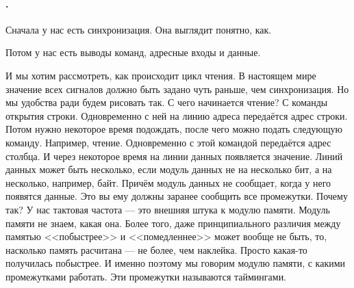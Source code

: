 \documentclass{article}
\begin{document}
    \paragraph{.}
    Сначала у нас есть синхронизация. Она выглядит понятно, как.
    \begin{center}
    \end{center}
    Потом у нас есть выводы команд, адресные входы и данные.
    \begin{center}
    \end{center}
    И мы хотим рассмотреть, как происходит цикл чтения. В настоящем мире значение всех сигналов должно быть задано чуть раньше, чем синхронизация. Но мы удобства ради будем рисовать так. С чего начинается чтение? С команды открытия строки. Одновременно с ней на линию адреса передаётся адрес строки. Потом нужно некоторое время подождать, после чего можно подать следующую команду. Например, чтение. Одновременно с этой командой передаётся адрес столбца. И через некоторое время на линии данных появляется значение. Линий данных может быть несколько, если модуль данных не на несколько бит, а на несколько, например, байт. Причём модуль данных не сообщает, когда у него появятся данные. Это вы ему должны заранее сообщить все промежутки. Почему так? У нас тактовая частота --- это внешняя штука к модулю памяти. Модуль памяти не знаем, какая она. Более того, даже принципиального различия между памятью <<побыстрее>> и <<помедленнее>> может вообще не быть, то, насколько память расчитана --- не более, чем наклейка. Просто какая-то получилась побыстрее. И именно поэтому мы говорим модулю памяти, с какими промежутками работать. Эти промежутки называются таймингами.
\end{document}
